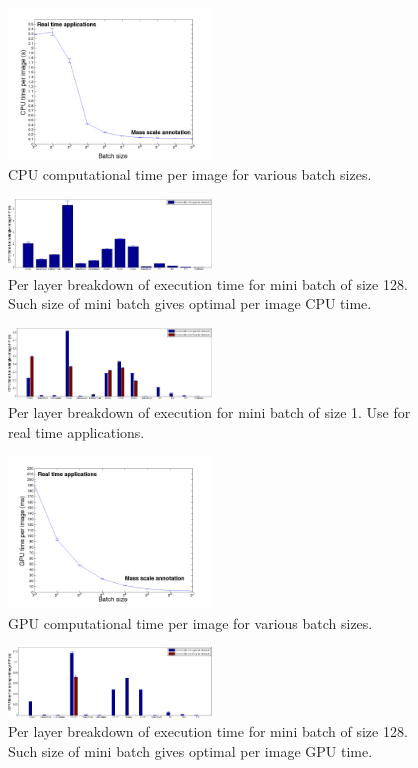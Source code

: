 \documentclass{article}
\begin{document}
\begin{figure}[ht]
  \includegraphics[width=0.48\textwidth]{img/eval_per_batch.png}
  \caption{CPU computational time per image for various batch sizes.}
\end{figure}
\begin{figure}[ht]
  \includegraphics[width=0.48\textwidth]{img/eval_per_layer_per_batch_128_batch_size.png}
  \caption{Per layer breakdown of execution time for mini batch of size 128. Such size of mini batch gives optimal per image CPU time.}
\end{figure}
\begin{figure}[ht]
  \includegraphics[width=0.48\textwidth]{img/eval_per_layer_per_batch_1_batch_size.png}
  \caption{Per layer breakdown of execution for mini batch of size 1. Use for real time applications.}
\end{figure}


\begin{figure}[ht]
  \includegraphics[width=0.48\textwidth]{img/eval_per_batch_GPU.png}
  \caption{GPU computational time per image for various batch sizes.}
\end{figure}
\begin{figure}[ht]
  \includegraphics[width=0.48\textwidth]{img/eval_per_layer_per_batch_GPU_128_batch_size.png}
  \caption{Per layer breakdown of execution time for mini batch of size 128. Such size of mini batch gives optimal per image GPU time.}
\end{figure}
\end{document}
